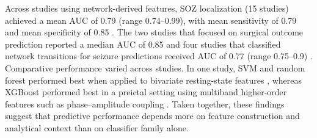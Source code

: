\documentclass[12pt]{article}
\begin{document}
Across studies using network-derived features, SOZ localization (15 studies) achieved a mean AUC of 0.79 (range 0.74--0.99), with mean sensitivity of 0.79 and mean specificity of 0.85 \cite{Klimes2019-ie,Balatskaya2020-vi,Goodale2020-lj,Narasimhan2020-af,Weiss2022-xy,Jiang2022-uq,Li2023-vy,Nahvi2023-lm,Wang2023-ys,Shahabi2023-ak,Sun2024-bj,Vila-Vidal2024-ha,Yin2024-ls,Conrad2024-uh,Xu2025-lh}. The two studies that focused on surgical outcome prediction \cite{Li2021-gq, Ivankovic2025-ng} reported a median AUC of 0.85 and four studies that classified network transitions for seizure predictions received AUC of 0.77 (range 0.75--0.9) \cite{Ye2023-jm,Doss2024-rs,Doss2024-ce,Wang2025-ij}. Comparative performance varied across studies. In one study, SVM and random forest performed best when applied to bivariate resting-state features \cite{Wang2023-ys}, whereas XGBoost performed best in a preictal setting using multiband higher-order features such as phase--amplitude coupling \cite{Xu2025-lh}. Taken together, these findings suggest that predictive performance depends more on feature construction and analytical context than on classifier family alone.
\end{document}
